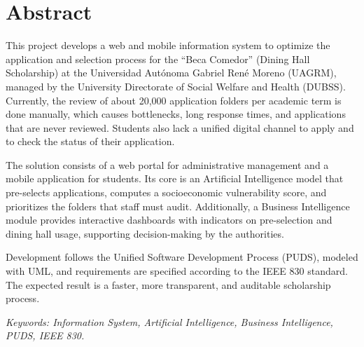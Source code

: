 
\section*{Abstract}

This project develops a web and mobile information system to optimize the application and selection process for the \enquote{Beca Comedor} (Dining Hall Scholarship) at the Universidad Autónoma Gabriel René Moreno (UAGRM), managed by the University Directorate of Social Welfare and Health (DUBSS). Currently, the review of about 20,000 application folders per academic term is done manually, which causes bottlenecks, long response times, and applications that are never reviewed. Students also lack a unified digital channel to apply and to check the status of their application.

The solution consists of a web portal for administrative management and a mobile application for students. Its core is an Artificial Intelligence model that pre-selects applications, computes a socioeconomic vulnerability score, and prioritizes the folders that staff must audit. Additionally, a Business Intelligence module provides interactive dashboards with indicators on pre-selection and dining hall usage, supporting decision-making by the authorities.

Development follows the Unified Software Development Process (PUDS), modeled with UML, and requirements are specified according to the IEEE 830 standard. The expected result is a faster, more transparent, and auditable scholarship process.

\indent\textit{Keywords: Information System, Artificial Intelligence, Business Intelligence, PUDS, IEEE 830.}
